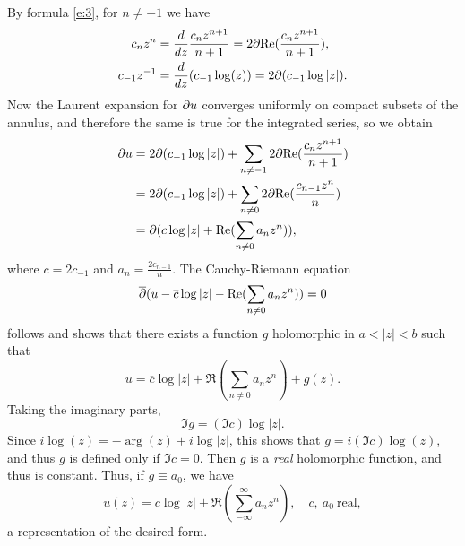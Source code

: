 \documentclass[a4paper,11pt]{article}
\begin{document}
By formula \eqref{e:3}, for $n \ne -1$ we have
$$
\begin{aligned}
  c_n z^n &= \frac{d}{dz} \frac{c_n z^{n+1}}{n+1} = 2 \p \Re(\frac{c_n
  z^{n+1}}{n+1}),\\
  c_{-1} z^{-1} &= \frac{d}{dz} (c_{-1} \log(z)) = 2 \p (c_{-1} \log|z|).
\end{aligned}
$$
Now the Laurent expansion for $\partial u$ converges uniformly on compact
subsets of the annulus, and therefore the same is true for the
integrated series, so we obtain
$$
\begin{aligned}
  \p u &= 2 \p (c_{-1} \log|z|) + \sum_{n\ne -1} 2\p \Re(\frac{c_n z^{n+1}}{
    n+1})\\
  &= 2 \p (c_{-1} \log|z|) + \sum_{n\ne 0} 2\p \Re(\frac{c_{n-1} z^{n}}{n}) \\
  &= \p (c \log|z| + \Re(\sum_{n\ne0} a_n z^n)),
\end{aligned}
$$
where $c = 2c_{-1}$ and $a_n = \frac{2c_{n-1}}{n}$.  The
Cauchy-Riemann equation
$$
\overline{\p} (u - \overline{c} \log |z| - \Re(
\sum_{n\ne 0} a_n z^n)) = 0
$$
follows and shows that there exists a function $g$ holomorphic in $a <
|z| < b$ such that
$$
u = \overline{c} \log |z| + \Re(\sum_{n\ne 0} a_n z^n) + g(z).
$$
Taking the imaginary parts,
$$
\Im g = (\Im c) \log|z|.
$$
Since $i\log(z) = -\arg(z) + i\log|z|$, this shows that $g = i(\Im
c)\log(z)$, and thus $g$ is defined only if $\Im c = 0$.  Then $g$ is
a \emph{real} holomorphic function, and thus is constant.  Thus, if $g
\equiv a_0$, we have
$$
u(z) = c \log|z| + \Re(\sum_{-\infty}^{\infty} a_n z^n),\quad
c,\ a_0\ \text{real},
$$
a representation of the desired form.
\end{document}
